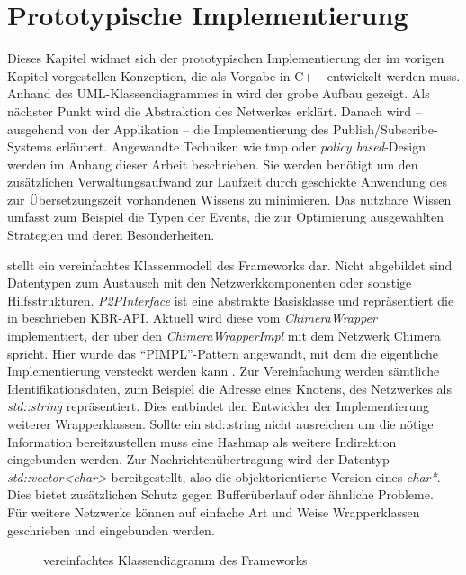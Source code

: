 \chapter{Prototypische Implementierung}
\label{chap:impl}
Dieses Kapitel widmet sich der prototypischen Implementierung der im vorigen Kapitel vorgestellen Konzeption, die als Vorgabe in C++ entwickelt werden muss. Anhand des UML-Klassendiagrammes in  wird der grobe Aufbau gezeigt. Als nächster Punkt wird die Abstraktion des Netwerkes erklärt. Danach wird -- ausgehend von der Applikation -- die Implementierung des Publish/Subscribe-Systems erläutert. Angewandte Techniken wie \ac{tmp} oder \emph{policy based}-Design werden im Anhang dieser Arbeit beschrieben. Sie werden benötigt um den zusätzlichen Verwaltungsaufwand zur Laufzeit durch geschickte Anwendung des zur Übersetzungszeit vorhandenen Wissens zu minimieren. Das nutzbare Wissen umfasst zum Beispiel die Typen der Events, die zur Optimierung ausgewählten Strategien und deren Besonderheiten.

 stellt ein vereinfachtes Klassenmodell des Frameworks dar. Nicht abgebildet sind Datentypen zum Austausch mit den Netzwerkkomponenten oder sonstige Hilfsstrukturen. \emph{P2PInterface} ist eine abstrakte Basisklasse und repräsentiert die in \cite{Dabek2003Towards} beschrieben KBR-API. Aktuell wird diese vom \emph{ChimeraWrapper} implementiert, der über den \emph{ChimeraWrapperImpl} mit dem Netzwerk Chimera spricht. Hier wurde das ``PIMPL''-Pattern angewandt, mit dem die eigentliche Implementierung versteckt werden kann \cite{Alexandrescu2001Modern}. Zur Vereinfachung werden sämtliche Identifikationsdaten, zum Beispiel die Adresse eines Knotens, des Netzwerkes als \emph{std::string} repräsentiert. Dies entbindet den Entwickler der Implementierung weiterer Wrapperklassen. Sollte ein std::string nicht ausreichen um die nötige Information bereitzustellen muss eine Hashmap als weitere Indirektion eingebunden werden. Zur Nachrichtenübertragung wird der Datentyp \emph{std::vector<char>} bereitgestellt, also die objektorientierte Version eines \emph{char*}. Dies bietet zusätzlichen Schutz gegen Bufferüberlauf oder ähnliche Probleme.\\
Für weitere Netzwerke können auf einfache Art und Weise Wrapperklassen geschrieben und eingebunden werden.

\begin{figure}[htbp]
\centering
{}
\caption{vereinfachtes Klassendiagramm des Frameworks}
\label{fig:uml}
\end{figure}

